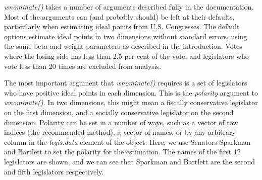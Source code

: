 \documentclass[12pt]{article}
\begin{document}
\begin{Schunk}
\end{Schunk}

\emph{wnominate()} takes a number of arguments described fully in
the documentation. Most of the arguments can (and probably should)
be left at their defaults, particularly when estimating ideal
points from U.S. Congresses.  The default options estimate ideal
points in two dimensions without standard errors, using the same
beta and weight parameters as described in the introduction. Votes
where the losing side has less than 2.5 per cent of the vote, and
legislators who vote less than 20 times are excluded from
analysis.

The most important argument that \emph{wnominate()} requires is a
set of legislators who have positive ideal points in each
dimension. This is the \emph{polarity} argument to \emph{wnominate()}.
In two dimensions, this might mean a fiscally conservative legislator
on the first dimension, and a socially conservative legislator on the
second dimension. Polarity can be set in a number of ways, such as a
vector of row indices (the recommended method), a
vector of names, or by any arbitrary column in the
\emph{legis.data} element of the \verb@rollcall@ object.  Here, we
use Senators Sparkman and Bartlett to set the polarity for the
estimation.  The names of the first 12 legislators are shown, and we
can see that Sparkman and Bartlett are the second and fifth
legislators respectively.
\end{document}
